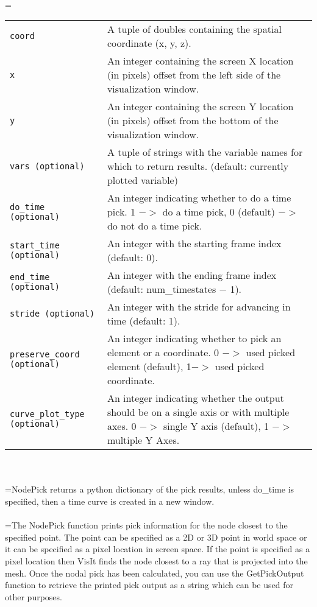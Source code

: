 \documentclass[10pt,a4paper]{report}
\begin{document}
 \\ 
\hangindent=\parindent 
\begin{tabular}{lp{9cm}}
\verb!coord! & A tuple of doubles containing the spatial coordinate (x, y, z). \\
\verb!x! & An integer containing the screen X location (in pixels) offset from the left side of the visualization window. \\
\verb!y! & An integer containing the screen Y location (in pixels) offset from the bottom of the visualization window. \\
\verb!vars (optional)! & A tuple of strings with the variable names for which to return results. (default: currently plotted variable) \\
\verb!do_time (optional)! & An integer indicating whether to do a time pick. 1 $-$$>$ do a time pick, 0 (default) $-$$>$ do not do a time pick. \\
\verb!start_time (optional)! & An integer with the starting frame index (default: 0). \\
\verb!end_time (optional)! & An integer with the ending frame index (default: num\_timestates $-$ 1). \\
\verb!stride (optional)! & An integer with the stride for advancing in time (default: 1). \\
\verb!preserve_coord (optional)! & An integer indicating whether to pick an element or a coordinate. 0 $-$$>$ used picked element (default), 1$-$$>$ used picked coordinate. \\
\verb!curve_plot_type (optional)! & An integer indicating whether the output should be on a single axis or with multiple axes. 0 $-$$>$ single Y axis (default), 1 $-$$>$ multiple Y Axes. \\
\end{tabular} \\[-2mm]


 \\ 
\hangindent=\parindent NodePick returns a python dictionary of the pick results, unless do\_time is specified, then a time curve is created in a new window. \\[-3mm] 

 \\ 
\hangindent=\parindent The NodePick function prints pick information for the node closest to the specified point. The point can be specified as a 2D or 3D point in world space or it can be specified as a pixel location in screen space. If the point is specified as a pixel location then VisIt finds the node closest to a ray that is projected into the mesh. Once the nodal pick has been calculated, you can use the GetPickOutput function to retrieve the printed pick output as a string which can be used for other purposes. \\[-3mm] 
\end{document}
